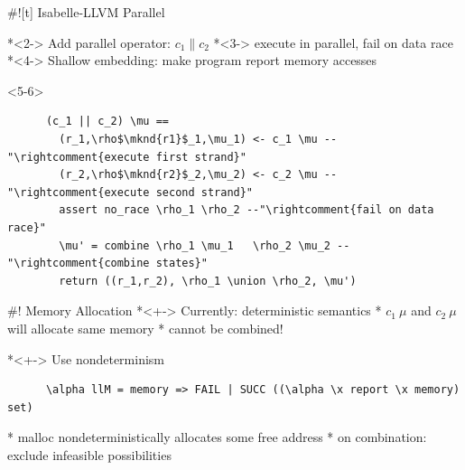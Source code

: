 \documentclass[fleqn]{beamer}
\begin{document}
{#![t] Isabelle-LLVM Parallel
  \newcommand{\mknd}[1]{\makebox[0pt]{\tikz[remember picture]{\node (#1) {};}}}

  *<2-> Add parallel operator: $c_1 \parallel c_2$
    *<3-> execute in parallel, fail on data race
  *<4-> Shallow embedding: make program report memory accesses



    \begin{onlyenv}<5-6>
    \begin{lstlisting}
      (c_1 || c_2) \mu ==
        (r_1,\rho$\mknd{r1}$_1,\mu_1) <- c_1 \mu --"\rightcomment{execute first strand}"
        (r_2,\rho$\mknd{r2}$_2,\mu_2) <- c_2 \mu --"\rightcomment{execute second strand}"
        assert no_race \rho_1 \rho_2 --"\rightcomment{fail on data race}"
        \mu' = combine \rho_1 \mu_1   \rho_2 \mu_2 --"\rightcomment{combine states}"
        return ((r_1,r_2), \rho_1 \union \rho_2, \mu')

    \end{lstlisting}

    \end{onlyenv}

}

#! Memory Allocation
  *<+-> Currently: deterministic semantics
    * $c_1~\mu$ and $c_2~\mu$ will allocate same memory
    * cannot be combined!

  *<+-> Use nondeterminism
    \begin{lstlisting}
      \alpha llM = memory => FAIL | SUCC ((\alpha \x report \x memory) set)
    \end{lstlisting}
    * malloc nondeterministically allocates some free address
    * on combination: exclude infeasible possibilities
\end{document}

